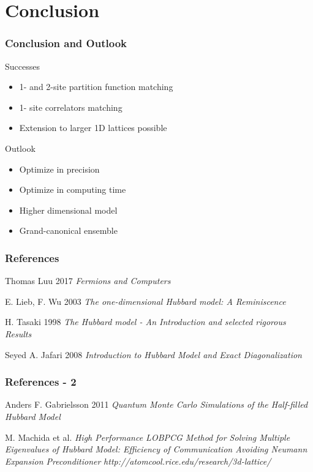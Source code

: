 \documentclass{beamer}
\begin{document}
\section[Conclusion]{Conclusion}
\begin{frame}
\frametitle{Conclusion and Outlook}
\begin{block}{Successes}
\begin{itemize}
\item 1- and 2-site partition function matching 
\item 1- site correlators matching
\item Extension to larger 1D lattices possible 
\end{itemize}
\end{block}

\begin{block}{Outlook}
	\begin{itemize}
		\item Optimize in precision
		\item Optimize in computing time
		\item Higher dimensional model
		\item Grand-canonical ensemble 
	\end{itemize}
\end{block}
\end{frame}

\appendix

\begin{thebibliography}{}
\begin{frame}
\frametitle{References}	
	Thomas Luu 2017
	\textit{Fermions and Computers}
	
	E. Lieb, F. Wu 2003
	\textit{The one-dimensional Hubbard model: A Reminiscence}
	
	H. Tasaki 1998
	\textit{The Hubbard model - An Introduction and selected rigorous Results}
	
	Seyed A. Jafari 2008
	\textit{Introduction to Hubbard Model and Exact Diagonalization}	
\end{frame}	
\begin{frame}
\frametitle{References - 2}
Anders F. Gabrielsson 2011
\textit{Quantum Monte Carlo Simulations of
	the Half-filled Hubbard Model}

M. Machida et al. \textit{High Performance LOBPCG Method for Solving Multiple Eigenvalues of Hubbard Model: Efficiency of Communication Avoiding Neumann Expansion Preconditioner}
\textit{http://atomcool.rice.edu/research/3d-lattice/}
\end{frame}
\end{thebibliography}
\end{document}
